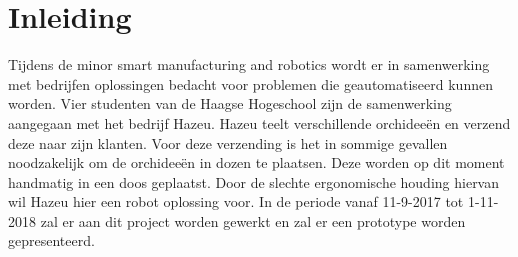 
\section{Inleiding}

Tijdens de minor smart manufacturing and robotics wordt er in samenwerking met bedrijfen oplossingen bedacht voor problemen die geautomatiseerd kunnen worden. Vier studenten van de Haagse Hogeschool zijn de samenwerking aangegaan met het bedrijf Hazeu. Hazeu teelt verschillende orchideeën en verzend deze naar zijn klanten. Voor deze verzending is het in sommige gevallen noodzakelijk om de orchideeën in dozen te plaatsen. Deze worden op dit moment handmatig in een doos geplaatst. Door de slechte ergonomische houding hiervan wil Hazeu hier een robot oplossing voor. In de periode vanaf 11-9-2017 tot 1-11-2018 zal er aan dit project worden gewerkt en zal er een prototype worden gepresenteerd.

\newpage
